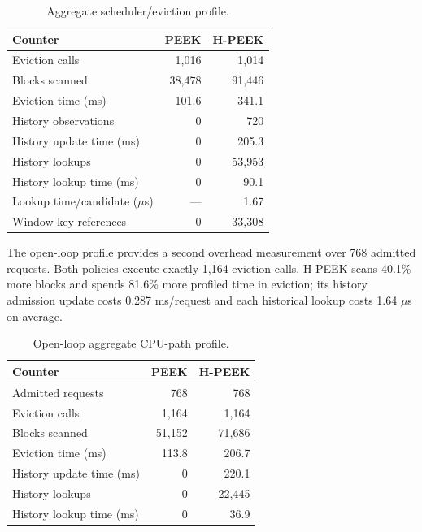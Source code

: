 \documentclass[10pt,twocolumn]{article}
\begin{document}
\begin{table}[t]
  \centering
  \caption{Aggregate scheduler/eviction profile.}
  \label{tab:overhead}
  \begin{tabular}{lrr}
    \toprule
    Counter & PEEK & H-PEEK \\
    \midrule
    Eviction calls & 1,016 & 1,014 \\
    Blocks scanned & 38,478 & 91,446 \\
    Eviction time (ms) & 101.6 & 341.1 \\
    History observations & 0 & 720 \\
    History update time (ms) & 0 & 205.3 \\
    History lookups & 0 & 53,953 \\
    History lookup time (ms) & 0 & 90.1 \\
    Lookup time/candidate ($\mu$s) & --- & 1.67 \\
    Window key references & 0 & 33,308 \\
    \bottomrule
  \end{tabular}
\end{table}

The open-loop profile provides a second overhead measurement over 768 admitted
requests. Both policies execute exactly 1,164 eviction calls. H-PEEK scans
40.1\% more blocks and spends 81.6\% more profiled time in eviction; its
history admission update costs 0.287 ms/request and each historical lookup
costs 1.64 $\mu$s on average.

\begin{table}[t]
  \centering
  \caption{Open-loop aggregate CPU-path profile.}
  \label{tab:open-loop-overhead}
  \begin{tabular}{lrr}
    \toprule
    Counter & PEEK & H-PEEK \\
    \midrule
    Admitted requests & 768 & 768 \\
    Eviction calls & 1,164 & 1,164 \\
    Blocks scanned & 51,152 & 71,686 \\
    Eviction time (ms) & 113.8 & 206.7 \\
    History update time (ms) & 0 & 220.1 \\
    History lookups & 0 & 22,445 \\
    History lookup time (ms) & 0 & 36.9 \\
    \bottomrule
  \end{tabular}
\end{table}
\end{document}
